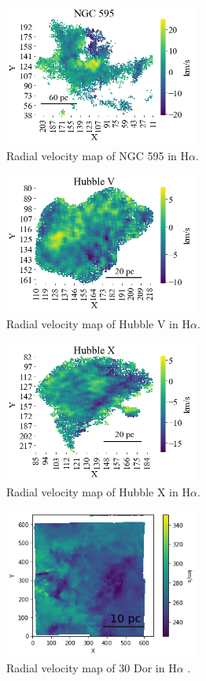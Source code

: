 \documentclass[fleqn,usenatbib, useAMS, a4paper]{mnras}
\begin{document}
\begin{figure}
\centering 
\includegraphics[width=2.5in]{Figures/M5T}
\caption{Radial velocity map of NGC 595 in H$\alpha$.}
\label{fig:M595}
\end{figure}

\begin{figure}
\centering 
\includegraphics[width=2.5in]{Figures/MV}
\caption{Radial velocity map of Hubble V in H$\alpha$.}
\label{fig:MHV}
\end{figure}

\begin{figure}
\centering 
\includegraphics[width=2.5in]{Figures/MX}
\caption{Radial velocity map of Hubble X in H$\alpha$.}
\label{fig:MHX}
\end{figure}

\begin{figure}
\centering 
\includegraphics[width=2.5in]{Figures/M30D}
\caption{Radial velocity map of 30 Dor in H$\alpha$ \citep{Castro:2018a}.}
\label{fig:M30Dor}
\end{figure}
\end{document}
